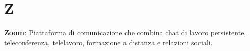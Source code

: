 \section*{Z}
\textbf{Zoom}: Piattaforma di comunicazione che combina chat di lavoro persistente, teleconferenza, telelavoro, formazione a distanza e relazioni sociali.\\

